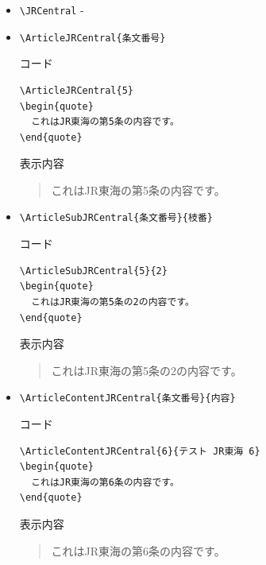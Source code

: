 \documentclass[oneside,10pt,a4paper]{jsarticle}
\begin{document}
  \begin{itemize}
    \item \verb|\JRCentral| - \JRCentral
    \item \verb|\ArticleJRCentral{条文番号}|
      \begin{itembox}[l]{コード}
        \begin{verbatim}
\ArticleJRCentral{5}
\begin{quote}
  これはJR東海の第5条の内容です。
\end{quote}\end{verbatim}
      \end{itembox}
      \begin{itembox}[l]{表示内容}
        \begin{quote}
          これはJR東海の第5条の内容です。
        \end{quote}
      \end{itembox}
    \item \verb|\ArticleSubJRCentral{条文番号}{枝番}|
      \begin{itembox}[l]{コード}
        \begin{verbatim}
\ArticleSubJRCentral{5}{2}
\begin{quote}
  これはJR東海の第5条の2の内容です。
\end{quote}\end{verbatim}
      \end{itembox}
      \begin{itembox}[l]{表示内容}
        \begin{quote}
          これはJR東海の第5条の2の内容です。
        \end{quote}
      \end{itembox}
    \newpage
    \item \verb|\ArticleContentJRCentral{条文番号}{内容}|
      \begin{itembox}[l]{コード}
        \begin{verbatim}
\ArticleContentJRCentral{6}{テスト JR東海 6}
\begin{quote}
  これはJR東海の第6条の内容です。
\end{quote}\end{verbatim}
      \end{itembox}
      \begin{itembox}[l]{表示内容}
        \begin{quote}
          これはJR東海の第6条の内容です。
        \end{quote}

\end{itembox}
\end{itemize}
\end{document}
